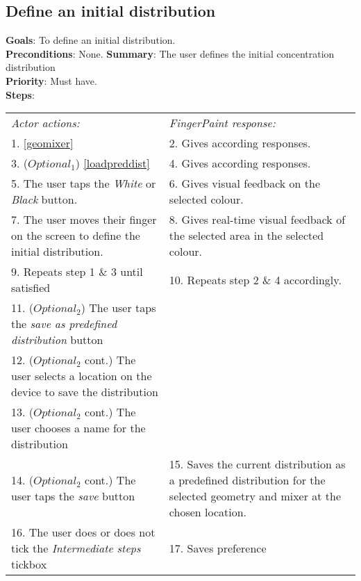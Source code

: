 \begin{appendices}
  \section{Define an initial distribution}
  \label{initdist}
  \textbf{Goals}: To define an initial distribution.\\
  \textbf{Preconditions}: None. %
  \textbf{Summary}: The user defines the initial concentration distribution\\
  \textbf{Priority}: Must have.\\
  \textbf{Steps}: \\
  \begin{tabular}{ p{} p{} }
  	\emph{Actor actions:} & \emph{FingerPaint response:} \\
    1. \ref{geomixer} & 2. Gives according responses. \\
    3. ($Optional_1$) \ref{loadpreddist} & 4. Gives according responses. \\
	5. The user taps the \emph{White} or \emph{Black} button. & 6. Gives visual feedback on the selected colour. \\
	7. The user moves their finger on the screen to define the initial distribution. & 8. Gives real-time visual feedback of the selected area in the selected colour.\\
    9. Repeats step 1 \& 3 until satisfied & 10.	Repeats step 2 \& 4 accordingly. \\
    11.	($Optional_2$) The user taps the \emph{save as predefined distribution} button  & \\
    12. ($Optional_2$ cont.) The user selects a location on the device to save the distribution & \\
    13. ($Optional_2$ cont.) The user chooses a name for the distribution & \\
    14. ($Optional_2$ cont.) The user taps the \emph{save} button & 15. Saves the current distribution as a predefined distribution for the selected geometry and mixer at the chosen location.\\
    16.	The user does or does not tick the \emph{Intermediate steps} tickbox & 17. Saves preference
  \end{tabular}


\end{appendices}
